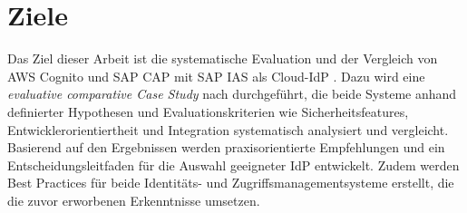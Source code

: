 \section{Ziele}
Das Ziel dieser Arbeit ist die systematische Evaluation und der Vergleich von AWS Cognito und \ac{SAP CAP} mit \ac{SAP IAS} als Cloud-\ac{IdP} . Dazu wird eine \textit{evaluative comparative Case Study} nach \citep{Kitchenham1995} durchgeführt, die beide Systeme anhand definierter Hypothesen und Evaluationskriterien wie Sicherheitsfeatures, Entwicklerorientiertheit und Integration systematisch analysiert und vergleicht. Basierend auf den Ergebnissen werden praxisorientierte Empfehlungen und ein Entscheidungsleitfaden für die Auswahl geeigneter \ac{IdP} entwickelt. Zudem werden Best Practices für beide Identitäts- und Zugriffsmanagementsysteme erstellt, die die zuvor erworbenen Erkenntnisse umsetzen.

